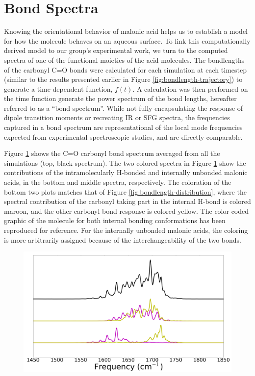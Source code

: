 \section {Bond Spectra}

Knowing the orientational behavior of malonic acid helps us to establish a model for how the molecule behaves on an aqueous surface. To link this computationally derived model to our group's experimental work, we turn to the computed spectra of one of the functional moieties of the acid molecules. The bondlengths of the carbonyl C=O bonds were calculated for each simulation at each timestep (similar to the results presented earlier in Figure \ref{fig:bondlength-trajectory}) to generate a time-dependent function, $f(t)$. A calculation was then performed on the time function generate the power spectrum of the bond lengths, hereafter referred to as a ``bond spectrum''. While not fully encapsulating the response of dipole transition moments or recreating IR or SFG spectra, the frequencies captured in a bond spectrum are representational of the local mode frequencies expected from experimental spectroscopic studies, and are directly comparable.

Figure \ref{fig:bond-spectra} shows the C=O carbonyl bond spectrum averaged from all the simulations (top, black spectrum). The two colored spectra in Figure \ref{fig:bond-spectra} show the contributions of the intramolecularly H-bonded and internally unbonded malonic acids, in the bottom and middle spectra, respectively. The coloration of the bottom two plots matches that of Figure \ref{fig:bondlength-distribution}, where the spectral contribution of the carbonyl taking part in the internal H-bond is colored maroon, and the other carbonyl bond response is colored yellow. The color-coded graphic of the molecule for both internal bonding conformations has been reproduced for reference. For the internally unbonded malonic acids, the coloring is more arbitrarily assigned because of the interchangeability of the two bonds.

\begin{figure}[h!]
	\begin{center}
		\includegraphics[scale=1.0]{images/bond-spectra/CarbonylBondSpectra.png}
		\caption{}
		\label{fig:bond-spectra}
	\end{center}
\end{figure}



